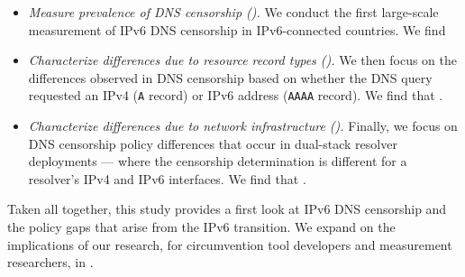 \begin{itemize}


  \item {\it Measure prevalence of DNS censorship ().} 
    We conduct the first large-scale measurement of IPv6 DNS censorship in
     IPv6-connected countries. We find 

  \item {\it Characterize differences due to resource record types
    ().}
    We then focus on the differences observed in DNS censorship based on
    whether the DNS query requested an IPv4 ({\tt A} record) or IPv6 address
    ({\tt AAAA} record). We find that .

  \item {\it Characterize differences due to network infrastructure
    ().}
    Finally, we focus on DNS censorship policy differences that occur in
    dual-stack resolver deployments --- \ie where the censorship determination
    is different for a resolver's IPv4 and IPv6 interfaces. We find that
    .

\end{itemize}

Taken all together, this study provides a first look at IPv6 DNS censorship and
the policy gaps that arise from the IPv6 transition. We expand on the
implications of our research, for circumvention tool developers and measurement
researchers, in .

\fi
